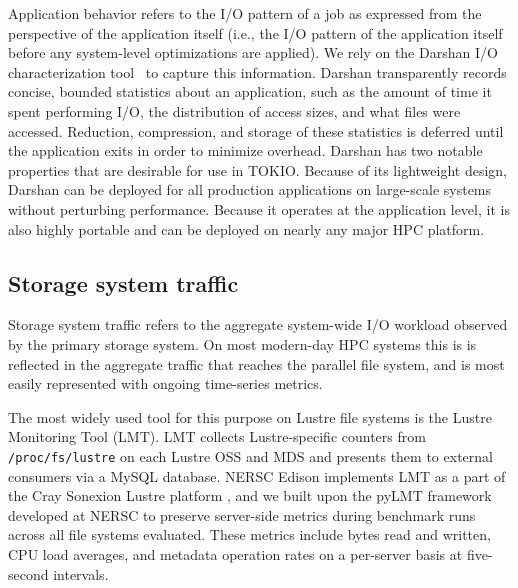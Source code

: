 \documentclass[conference,10pt,compsocconf]{IEEEtran}
\begin{document}
Application behavior refers to the I/O pattern of a job as expressed from
the perspective of the application itself (i.e., the I/O pattern of the
application itself before any system-level optimizations are applied).
We rely on the Darshan I/O characterization tool~\cite{carns200924}
to capture this information.  Darshan transparently records concise,
bounded statistics about an application, such as the amount of time it
spent performing I/O, the distribution of access sizes, and what files
were accessed.  Reduction, compression, and storage of these statistics
is deferred until the application exits in order to minimize overhead.
Darshan has two notable properties that are desirable for use in TOKIO.
Because of its lightweight design, Darshan can be deployed for all
production applications on large-scale systems without perturbing
performance.  Because it operates at the application level, it is also highly
portable and can be deployed on nearly any major HPC platform.

%

\subsection{Storage system traffic}

Storage system traffic refers to the aggregate system-wide I/O workload
observed by the primary storage system.  On most modern-day HPC systems this
is is reflected in the aggregate traffic that reaches the parallel file
system, and is most easily represented with ongoing time-series metrics.

\label{sec:methods/lmt}
The most widely used tool for this purpose on Lustre file systems is the Lustre
Monitoring Tool (LMT).  LMT collects Lustre-specific
counters from \texttt{/proc/fs/lustre} on each Lustre OSS and MDS and presents
them to external consumers via a MySQL database.  NERSC Edison implements LMT
as a part of the Cray Sonexion Lustre platform \cite{Keopp2014}, and we built
upon the pyLMT framework developed at NERSC \cite{Uselton2009} to preserve
server-side metrics during benchmark runs across all file systems evaluated.
These metrics include bytes read and written, CPU load averages, and metadata
operation rates on a per-server basis at five-second intervals.
\end{document}

